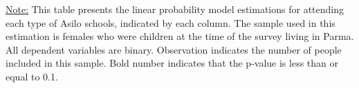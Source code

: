 \begin{footnotesize}
\noindent\underline{Note:} This table presents the linear probability model estimations for attending each type of Asilo schools, indicated by each column. The sample used in this estimation is females who were children at the time of the survey living in Parma. All dependent variables are binary. Observation indicates the number of people included in this sample. Bold number indicates that the p-value is less than or equal to 0.1.
\end{footnotesize}
